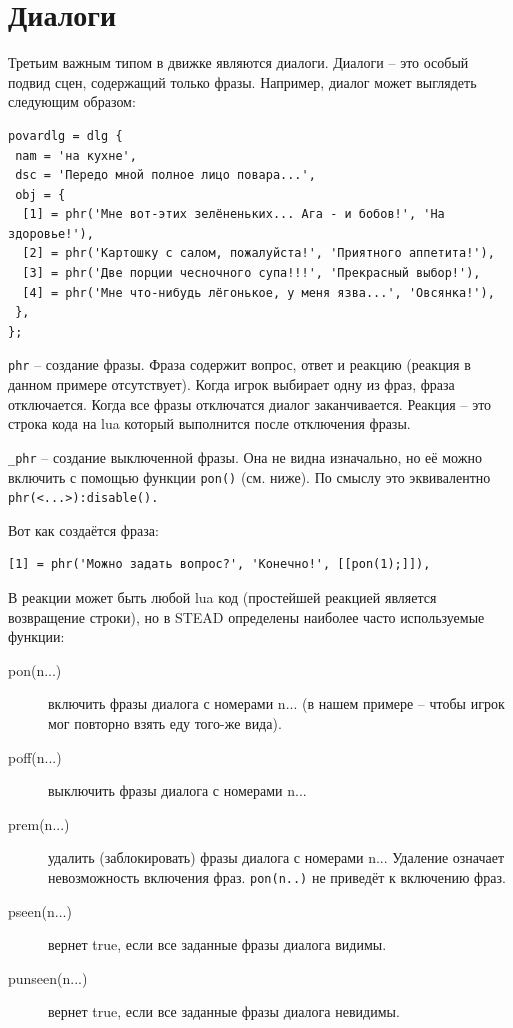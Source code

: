 \documentclass[12pt]{article}
\begin{document}
\section{Диалоги}


Третьим важным типом в движке являются диалоги. Диалоги -- это особый подвид сцен, содержащий только фразы. Например, диалог может выглядеть следующим образом:

\begin{verbatim}
povardlg = dlg {
 nam = 'на кухне',
 dsc = 'Передо мной полное лицо повара...',
 obj = {
  [1] = phr('Мне вот-этих зелёненьких... Ага - и бобов!', 'На здоровье!'),
  [2] = phr('Картошку с салом, пожалуйста!', 'Приятного аппетита!'),
  [3] = phr('Две порции чесночного супа!!!', 'Прекрасный выбор!'),
  [4] = phr('Мне что-нибудь лёгонькое, у меня язва...', 'Овсянка!'),
 },
};
\end{verbatim}

\verb/phr/ -- создание фразы. Фраза содержит вопрос, ответ и реакцию (реакция в данном примере отсутствует). Когда игрок выбирает одну из фраз, фраза отключается. Когда все фразы отключатся диалог заканчивается. Реакция -- это строка кода на lua который выполнится после отключения фразы.

\verb/_phr/ -- создание выключенной фразы. Она не видна изначально, но её можно включить с помощью функции \verb/pon()/ (см. ниже). По смыслу это эквивалентно \verb/phr(<...>):disable()./

Вот как создаётся фраза:

\begin{verbatim}
[1] = phr('Можно задать вопрос?', 'Конечно!', [[pon(1);]]),
\end{verbatim}

В реакции может быть любой lua код (простейшей реакцией является возвращение строки), но в STEAD определены наиболее часто используемые функции:

\begin{description}
\item[pon(n...)] включить фразы диалога с номерами n... (в нашем примере -- чтобы игрок мог повторно взять еду того-же вида).
\item[poff(n...)] выключить фразы диалога с номерами n...
\item[prem(n...)] удалить (заблокировать) фразы диалога с номерами n... Удаление означает невозможность включения фраз. \verb/pon(n..)/ не приведёт к включению фраз.
\item[pseen(n...)] вернет true, если все заданные фразы диалога видимы.
\item[punseen(n...)] вернет true, если все заданные фразы диалога невидимы.
\end{description}
\end{document}
